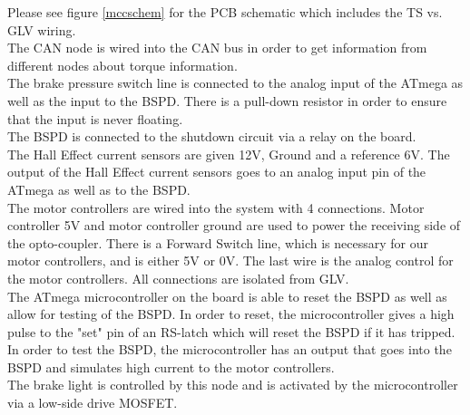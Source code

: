 \documentclass{article}
\begin{document}
        {Please see figure \ref{mccschem} for the PCB schematic which includes the TS vs. GLV wiring.\\

        The CAN node is wired into the CAN bus in order to get information from different nodes about torque information. \\

        The brake pressure switch line is connected to the analog input of the ATmega as well as the input to the BSPD. There is a pull-down resistor in order to ensure that the input is never floating.\\

        The BSPD is connected to the shutdown circuit via a relay on the board.\\

        The Hall Effect current sensors are given 12V, Ground and a reference 6V. The output of the Hall Effect current sensors goes to an analog input pin of the ATmega as well as to the BSPD.\\

        The motor controllers are wired into the system with 4 connections. Motor controller 5V and motor controller ground are used to power the receiving side of the opto-coupler. There is a Forward Switch line, which is necessary for our motor controllers, and is either 5V or 0V. The last wire is the analog control for the motor controllers. All connections are isolated from GLV.\\

        The ATmega microcontroller on the board is able to reset the BSPD as well as allow for testing of the BSPD. In order to reset, the microcontroller gives a high pulse to the "set" pin of an RS-latch which will reset the BSPD if it has tripped. In order to test the BSPD, the microcontroller has an output that goes into the BSPD and simulates high current to the motor controllers.\\

        The brake light is controlled by this node and is activated by the microcontroller via a low-side drive MOSFET.\\

}
\end{document}
